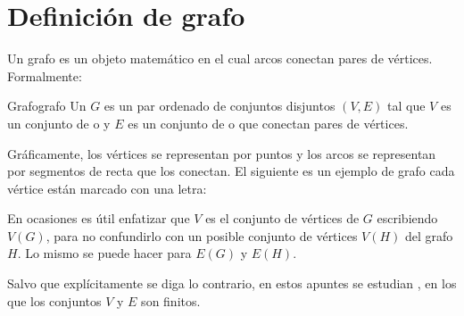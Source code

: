 \section{Definición de grafo}
\label{sec:definicion_de_grafo}

Un grafo es un objeto matemático en el cual arcos conectan pares de vértices. Formalmente:

\begin{definicion}{Grafo}{grafo}
  Un  $G$ es un par ordenado de conjuntos disjuntos $(V, E)$ tal que $V$ es un conjunto de  o  y $E$ es un conjunto de  o  que conectan pares de vértices.
\end{definicion}

Gráficamente, los vértices se representan por puntos y los arcos se representan por segmentos de recta que los conectan. El siguiente es un ejemplo de grafo cada vértice están marcado con una letra:

\begin{center}
\end{center}

En ocasiones es útil enfatizar que $V$ es el conjunto de vértices de $G$ escribiendo $V(G)$, para no confundirlo con un posible conjunto de vértices $V(H)$ del grafo $H$. Lo mismo se puede hacer para $E(G)$ y $E(H)$.

Salvo que explícitamente se diga lo contrario, en estos apuntes se estudian , en los que los conjuntos $V$ y $E$ son finitos.


